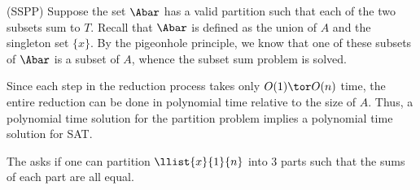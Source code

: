 \documentclass{article}
\begin{document}
\begin{solution}
\begin{subproof}[Correctness.]
  (SS\pmi PP)
  Suppose the set \( \Abar \) has a valid partition such that each of the two subsets sum to \( T \).
  Recall that \( \Abar \) is defined as the union of \( A \) and the singleton set \( \{x\} \).
  By the pigeonhole principle, we know that one of these subsets of \( \Abar \) is a subset of \( A \), whence the subset sum problem is solved.
\end{subproof}
Since each step in the reduction process takes only \( O(1)\tor O(n) \) time, the entire reduction can be done in polynomial time relative to the size of \( A \).
Thus, a polynomial time solution for the partition problem implies a polynomial time solution for SAT.
\end{solution}
\pagebreak


\begin{subexercise}\label{qs:3ptn}
  The  asks if one can partition \( \llist{x}{1}{n} \) into 3 parts such that the sums of each part are all equal.
\end{subexercise}
\end{document}
